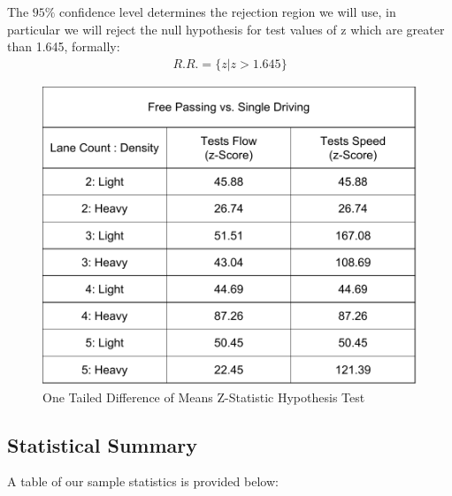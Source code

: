 \documentclass{amsart}
\begin{document}
	The $95\%$ confidence level determines the rejection region we will use, in particular we will reject the null hypothesis for test values of z which are greater than 1.645, formally:
	\begin{align*}
		R.R. = \{ z | z>1.645\}
	\end{align*}
\begin{figure}[h]
	\centering
	\includegraphics[scale=0.4]{MCMProbablityZ}
	\caption{One Tailed Difference of Means Z-Statistic Hypothesis Test}
	\label{MCMProbabilityZ}
	\end{figure}
	
	\subsection{Statistical Summary}A table of our sample statistics is provided below:
	
\end{document}
